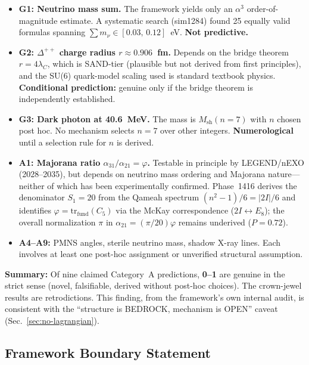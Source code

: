 \documentclass[aps,prd,twocolumn,superscriptaddress,floatfix,nofootinbib]{revtex4-2}
\theoremstyle{definition}
\theoremstyle{remark}
\newcommand{\vp}{\varphi}
\begin{document}
\begin{itemize}
\item \textbf{G1: Neutrino mass sum.}  The framework yields only an
      $\alpha^3$ order-of-magnitude estimate.  A systematic search
      (sim1284) found 25 equally valid formulas spanning
      $\sum m_\nu \in [0.03,\, 0.12]$~eV.  \textbf{Not predictive.}

\item \textbf{G2: $\Delta^{++}$ charge radius $r \approx 0.906$~fm.}
      Depends on the bridge theorem $r = 4\lambda_C$, which is
      SAND-tier (plausible but not derived from first principles), and
      the SU(6) quark-model scaling used is standard textbook physics.
      \textbf{Conditional prediction:} genuine only if the bridge
      theorem is independently established.

\item \textbf{G3: Dark photon at 40.6~MeV.}  The mass is
      $M_\text{sh}(n{=}7)$ with $n$ chosen post hoc.  No mechanism
      selects $n{=}7$ over other integers.  \textbf{Numerological}
      until a selection rule for $n$ is derived.

\item \textbf{A1: Majorana ratio $\alpha_{31}/\alpha_{21} = \vp$.}
      Testable in principle by LEGEND/nEXO (2028--2035), but depends
      on neutrino mass ordering and Majorana nature---neither of which
      has been experimentally confirmed.  Phase~1416 derives the
      denominator $S_1{=}20$ from the Qameah spectrum
      $(n^2-1)/6 = |2I|/6$ and identifies $\vp = \mathrm{tr}_{\mathrm{fund}}(C_5)$
      via the McKay correspondence ($2I\leftrightarrow E_8$); the overall
      normalization $\pi$ in $\alpha_{21} = (\pi/20)\vp$ remains underived
      ($P=0.72$).

\item \textbf{A4--A9:} PMNS angles, sterile neutrino mass, shadow
      X-ray lines.  Each involves at least one post-hoc assignment or
      unverified structural assumption.
\end{itemize}

\noindent
\textbf{Summary:} Of nine claimed Category~A predictions,
\textbf{0--1} are genuine in the strict sense (novel, falsifiable,
derived without post-hoc choices).  The crown-jewel results are
retrodictions.  This finding, from the framework's own internal audit,
is consistent with the ``structure is BEDROCK, mechanism is OPEN''
caveat (Sec.~\ref{sec:no-lagrangian}).

\subsection{Framework Boundary Statement}
\label{sec:framework-boundary}
\end{document}
